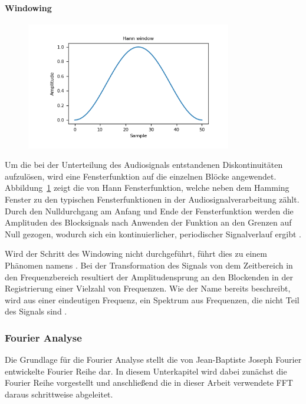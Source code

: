 \paragraph{Windowing}
\begin{figure}
  \centering
  \includegraphics[width=0.8\textwidth, keepaspectratio]{images/hann_window.png}
  \label{fig:vonHannFenster}
\end{figure}
Um die bei der Unterteilung des Audiosignals entstandenen Diskontinuitäten aufzulösen, wird eine Fensterfunktion auf die einzelnen Blöcke angewendet.
Abbildung~\ref{fig:vonHannFenster} zeigt die von Hann Fensterfunktion, welche neben dem Hamming Fenster zu den typischen Fensterfunktionen in der Audiosignalverarbeitung zählt.
Durch den Nulldurchgang am Anfang und Ende der Fensterfunktion werden die Amplituden des Blocksignals nach Anwenden der Funktion an den Grenzen auf Null gezogen, wodurch sich ein kontinuierlicher, periodischer Signalverlauf ergibt \autocite[vgl.][S. 462]{richter_signal_2022}.

Wird der Schritt des Windowing nicht durchgeführt, führt dies zu einem Phänomen namens .
Bei der Transformation des Signals von dem Zeitbereich in den Frequenzbereich resultiert der Amplitudensprung an den Blockenden in der Registrierung einer Vielzahl von Frequenzen.
Wie der Name bereits beschreibt, wird aus einer eindeutigen Frequenz, ein Spektrum aus Frequenzen, die nicht Teil des Signals sind \autocite[vgl.][S. 1296]{wu_new_2012}.

\subsubsection{Fourier Analyse}

\textauthor{\vJB}{}{}

Die Grundlage für die Fourier Analyse stellt die von Jean-Baptiste Joseph Fourier entwickelte Fourier Reihe dar.
In diesem Unterkapitel wird dabei zunächst die Fourier Reihe vorgestellt und anschließend die in dieser Arbeit verwendete \ac{FFT} daraus schrittweise abgeleitet.

